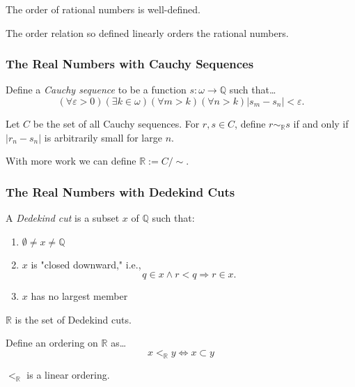 \begin{lemma}
The order of rational numbers is well-defined.
\end{lemma}

\noindent The order relation so defined linearly orders the rational numbers.

\subsubsection{The Real Numbers with Cauchy Sequences}\label{realnumberswithcauchysequences}

Define a \emph{Cauchy sequence} to be a function $s: \omega \rightarrow \mathbb{Q}$ such that\dots
$$(\forall \varepsilon > 0)(\exists k \in \omega)(\forall m > k)(\forall n > k) |s_m - s_n| < \varepsilon.$$

\noindent Let $C$ be the set of all Cauchy sequences. For $r,s \in C$, define $r \sim_{\mathbb{R}} s$ if and only if $|r_n - s_n|$
is arbitrarily small for large $n$.\newline

\noindent With more work we can define $\mathbb{R} := C / \sim$.

\subsubsection{The Real Numbers with Dedekind Cuts}\label{realnumberswithdedekindcuts}

A \emph{Dedekind cut} is a subset $x$ of $\mathbb{Q}$ such that:
\begin{enumerate}
  \item $\emptyset \neq x \neq \mathbb{Q}$
  \item $x$ is "closed downward," i.e.,
		$$q \in x \land r < q \Rightarrow r \in x.$$
  \item $x$ has no largest member
\end{enumerate}

\noindent $\mathbb{R}$ is the set of Dedekind cuts.

Define an ordering on $\mathbb{R}$ as\dots
$$x <_{\mathbb{R}} y \Leftrightarrow x \subset y$$

\begin{proposition}
$<_{\mathbb{R}}$ is a linear ordering.
\end{proposition}


